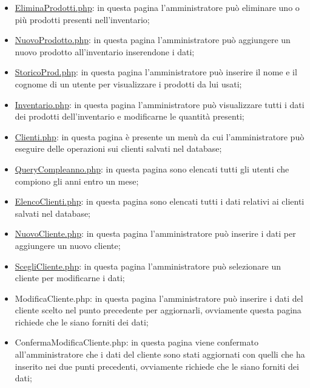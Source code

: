 {\begin{itemize}
		\item \href{http://tecweb2016.studenti.math.unipd.it/smarches/EliminaProdotti.php}{EliminaProdotti.php}: in questa pagina l'amministratore può eliminare uno o più prodotti presenti nell'inventario;
		\item \href{http://tecweb2016.studenti.math.unipd.it/smarches/NuovoProdotto.php}{NuovoProdotto.php}: in questa pagina l'amministratore può aggiungere un nuovo prodotto all'inventario inserendone i dati;
		\item \href{http://tecweb2016.studenti.math.unipd.it/smarches/StoricoProd.php}{StoricoProd.php}: in questa pagina l'amministratore può inserire il nome e il cognome di un utente per visualizzare i prodotti da lui usati;
		\item \href{http://tecweb2016.studenti.math.unipd.it/smarches/Inventario.php}{Inventario.php}: in questa pagina l'amministratore può visualizzare tutti i dati dei prodotti dell'inventario e modificarne le quantità presenti;
		\item \href{http://tecweb2016.studenti.math.unipd.it/smarches/Clienti.php}{Clienti.php}: in questa pagina è presente un menù da cui l'amministratore può eseguire delle operazioni sui clienti salvati nel database;
		\item \href{http://tecweb2016.studenti.math.unipd.it/smarches/QueryCompleanno.php}{QueryCompleanno.php}: in questa pagina sono elencati tutti gli utenti che compiono gli anni entro un mese;
		\item \href{http://tecweb2016.studenti.math.unipd.it/smarches/ElencoClienti.php}{ElencoClienti.php}: in questa pagina sono elencati tutti i dati relativi ai clienti salvati nel database;
		\item \href{http://tecweb2016.studenti.math.unipd.it/smarches/NuovoCliente.php}{NuovoCliente.php}: in questa pagina l'amministratore può inserire i dati per aggiungere un nuovo cliente;
		\item \href{http://tecweb2016.studenti.math.unipd.it/smarches/ScegliCliente.php}{ScegliCliente.php}: in questa pagina l'amministratore può selezionare un cliente per modificarne i dati;
		\item ModificaCliente.php: in questa pagina l'amministratore può inserire i dati del cliente scelto nel punto precedente per aggiornarli, ovviamente questa pagina richiede che le siano forniti dei dati;
		\item ConfermaModificaCliente.php: in questa pagina viene confermato all'amministratore che i dati del cliente sono stati aggiornati con quelli che ha inserito nei due punti precedenti, ovviamente richiede che le siano forniti dei dati;

\end{itemize}}
